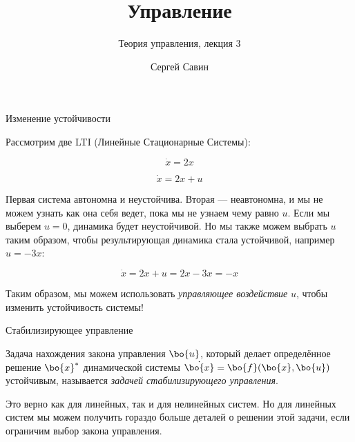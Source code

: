 \documentclass{beamer}
\title{Управление}
\subtitle{Теория управления, лекция 3}
\author{Сергей Савин}
\date{\mydate}
\begin{document}
\maketitle

\begin{frame}{Изменение устойчивости}
	\begin{flushleft}
		
		Рассмотрим две LTI (Линейные Стационарные Системы):
		
		\begin{equation}
			\dot{x} = 2 x
		\end{equation}
		
		\begin{equation}
			\dot{x} = 2 x + u
		\end{equation}
		
		Первая система автономна и неустойчива. Вторая — неавтономна, и мы не можем узнать как она себя ведет, пока мы не узнаем чему равно $u$. Если мы выберем $u=0$, динамика будет неустойчивой. Но мы также можем выбрать $u$ таким образом, чтобы результирующая динамика стала устойчивой, например $u=-3x$:
		
		\begin{equation}
			\dot{x} = 2 x + u = 2 x - 3x = -x
		\end{equation}
		
		\begin{block}{ }
			Таким образом, мы можем использовать \emph{управляющее воздействие} $u$, чтобы изменить устойчивость системы!
		\end{block}
		
	\end{flushleft}
\end{frame}

\begin{frame}{Стабилизирующее управление}
	\begin{flushleft}
		
		\begin{definition}
			Задача нахождения закона управления $\bo{u}$, который делает определённое решение $\bo{x}^*$ динамической системы $\dot{\bo{x}} = \bo{f}(\bo{x}, \bo{u})$ устойчивым, называется \emph{задачей стабилизирующего управления}.
		\end{definition}
		
		\bigskip
		
		Это верно как для линейных, так и для нелинейных систем. Но для линейных систем мы можем получить гораздо больше деталей о решении этой задачи, если ограничим выбор закона управления.
		
	\end{flushleft}
\end{frame}
\end{document}
